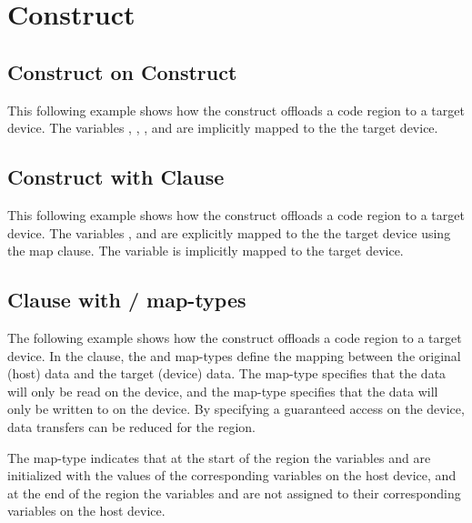 \pagebreak
\chapter{ Construct}
\label{chap:target}

\section{ Construct on  Construct}

This following example shows how the  construct offloads a code 
region to a target device. The variables , , , and  are implicitly mapped 
to the the target device.



\section{ Construct with  Clause}

This following example shows how the  construct offloads a code 
region to a target device. The variables ,  and  are explicitly mapped to the 
the target device using the map clause. The variable  is implicitly mapped to 
the target device.



\section{ Clause with / map-types}

The following example shows how the  construct offloads a code region 
to a target device. In the  clause, the  and  
map-types define the mapping between the original (host) data and the target (device) 
data. The  map-type specifies that the data will only be read on the 
device, and the  map-type specifies that the data will only be written 
to on the device. By specifying a guaranteed access on the device, data transfers 
can be reduced for the  region.

The  map-type indicates that at the start of the  region 
the variables  and  are initialized with the values of the corresponding variables 
on the host device, and at the end of the  region the variables 
 and  are not assigned to their corresponding variables on the host device.

